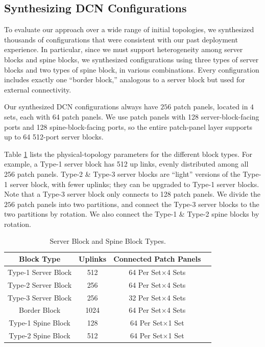 \documentclass[letterpaper,twocolumn,10pt]{article}
\begin{document}
\subsection{Synthesizing DCN Configurations}\label{dcn_configurations}

To evaluate our approach over a wide range of initial topologies, we synthesized thousands of configurations that were consistent with our past deployment experience.  In particular, since we must support heterogeneity among server blocks and spine blocks, we synthesized configurations using three types of server blocks and two types of spine block, in various combinations.  Every configuration includes exactly one “border block,” analogous to a server block but used for external connectivity.


Our synthesized DCN configurations always have $256$ patch panels, located in $4$ sets, each with 64 patch panels. We use patch panels with 128 server-block-facing ports and 128 spine-block-facing ports, so the entire patch-panel layer supports up to 64 512-port server blocks.

Table \ref{blocktypes} lists the physical-topology parameters for the different block types. For example, a Type-1 server block has 512 up links, evenly distributed among all 256 patch panels. Type-2 \& Type-3 server blocks are ``light''  versions of the Type-1 server block, with fewer uplinks; they can be upgraded to Type-1 server blocks. Note that a Type-3 server block only connects to 128 patch panels. We divide the $256$ patch panels into two partitions, and connect the Type-3 server blocks to the two partitions by rotation. We also connect the Type-1 \& Type-2 spine blocks by rotation.

\begin{table}[ht]
\small
\centering
\caption{Server Block and Spine Block Types.}\label{blocktypes}
\begin{tabular}{| c | c | c | c |}
\hline
Block Type & Uplinks & Connected Patch Panels \\
\hline
Type-1 Server Block & 512 & 64 Per Set$\times$4 Sets\\
\hline
Type-2 Server Block & 256 & 64 Per Set$\times$4 Sets \\
\hline
Type-3 Server Block & 256 & 32 Per Set$\times$4 Sets \\
\hline
Border Block & 1024 & 64 Per Set$\times$4 Sets \\
\hline
Type-1 Spine Block & 128 & 64 Per Set$\times$1 Set \\
\hline
Type-2 Spine Block & 512 & 64 Per Set$\times$1 Set \\
\hline
\end{tabular}
\end{table}
\end{document}
